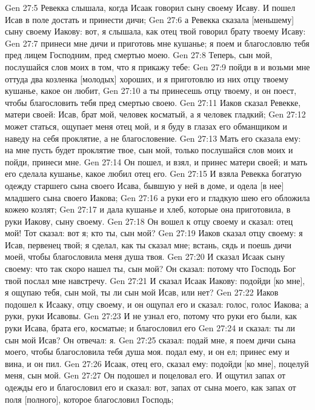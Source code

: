 \vs Gen 27:5 Ревекка слышала, когда Исаак говорил сыну своему Исаву. И пошел Исав в поле достать и принести дичи;
\vs Gen 27:6 а Ревекка сказала [меньшему] сыну своему Иакову: вот, я слышала, как отец твой говорил брату твоему Исаву:
\vs Gen 27:7 принеси мне дичи и приготовь мне кушанье; я поем и благословлю тебя пред лицем Господним, пред смертью моею.
\vs Gen 27:8 Теперь, сын мой, послушайся слов моих в том, что я прикажу тебе:
\vs Gen 27:9 пойди в  и возьми мне оттуда два козленка [молодых] хороших, и я приготовлю из них отцу твоему кушанье, какое он любит,
\vs Gen 27:10 а ты принесешь отцу твоему, и он поест, чтобы благословить тебя пред смертью своею.
\vs Gen 27:11 Иаков сказал Ревекке, матери своей: Исав, брат мой, человек косматый, а я человек гладкий;
\vs Gen 27:12 может статься, ощупает меня отец мой, и я буду в глазах его обманщиком и наведу на себя проклятие, а не благословение.
\vs Gen 27:13 Мать его сказала ему: на мне пусть будет проклятие твое, сын мой, только послушайся слов моих и пойди, принеси мне.
\vs Gen 27:14 Он пошел, и взял, и принес матери своей; и мать его сделала кушанье, какое любил отец его.
\vs Gen 27:15 И взяла Ревекка богатую одежду старшего сына своего Исава, бывшую у ней в доме, и одела [в нее] младшего сына своего Иакова;
\vs Gen 27:16 а руки его и гладкую шею его обложила кожею козлят;
\vs Gen 27:17 и дала кушанье и хлеб, которые она приготовила, в руки Иакову, сыну своему.
\vs Gen 27:18 Он вошел к отцу своему и сказал: отец мой! Тот сказал: вот я; кто ты, сын мой?
\vs Gen 27:19 Иаков сказал отцу своему: я Исав, первенец твой; я сделал, как ты сказал мне; встань, сядь и поешь дичи моей, чтобы благословила меня душа твоя.
\vs Gen 27:20 И сказал Исаак сыну своему: что так скоро нашел ты, сын мой? Он сказал: потому что Господь Бог твой послал мне навстречу.
\vs Gen 27:21 И сказал Исаак Иакову: подойди [ко мне], я ощупаю тебя, сын мой, ты ли сын мой Исав, или нет?
\vs Gen 27:22 Иаков подошел к Исааку, отцу своему, и он ощупал его и сказал: голос, голос Иакова; а руки, руки Исавовы.
\vs Gen 27:23 И не узнал его, потому что руки его были, как руки Исава, брата его, косматые; и благословил его
\vs Gen 27:24 и сказал: ты ли сын мой Исав? Он отвечал: я.
\vs Gen 27:25  сказал: подай мне, я поем дичи сына моего, чтобы благословила тебя душа моя.  подал ему, и он ел; принес ему и вина, и он пил.
\vs Gen 27:26 Исаак, отец его, сказал ему: подойди [ко мне], поцелуй меня, сын мой.
\vs Gen 27:27 Он подошел и поцеловал его. И ощутил  запах от одежды его и благословил его и сказал: вот, запах от сына моего, как запах от поля [полного], которое благословил Господь;
